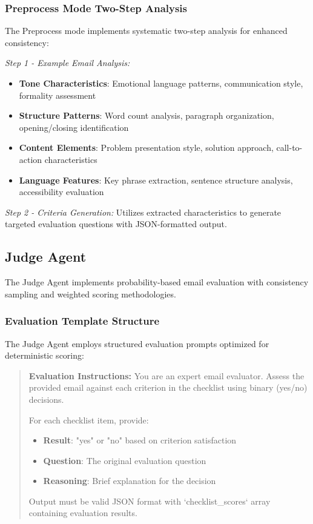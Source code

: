 \subsubsection{Preprocess Mode Two-Step Analysis}

The Preprocess mode implements systematic two-step analysis for enhanced consistency:

\textit{Step 1 - Example Email Analysis:}
\begin{itemize}
    \item \textbf{Tone Characteristics}: Emotional language patterns, communication style, formality assessment
    \item \textbf{Structure Patterns}: Word count analysis, paragraph organization, opening/closing identification
    \item \textbf{Content Elements}: Problem presentation style, solution approach, call-to-action characteristics
    \item \textbf{Language Features}: Key phrase extraction, sentence structure analysis, accessibility evaluation
\end{itemize}

\textit{Step 2 - Criteria Generation:}
Utilizes extracted characteristics to generate targeted evaluation questions with JSON-formatted output.

\subsection{Judge Agent}
\label{subsec:judge-agent-prompts}

The Judge Agent implements probability-based email evaluation with consistency sampling and weighted scoring methodologies.

\subsubsection{Evaluation Template Structure}

The Judge Agent employs structured evaluation prompts optimized for deterministic scoring:

\begin{quote}
\textbf{Evaluation Instructions:} You are an expert email evaluator. Assess the provided email against each criterion in the checklist using binary (yes/no) decisions.

For each checklist item, provide:
\begin{itemize}
    \item \textbf{Result}: "yes" or "no" based on criterion satisfaction
    \item \textbf{Question}: The original evaluation question
    \item \textbf{Reasoning}: Brief explanation for the decision
\end{itemize}

Output must be valid JSON format with `checklist\_scores` array containing evaluation results.
\end{quote}

